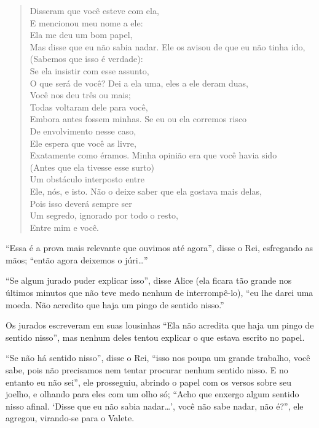 \begin{quote}
Disseram que você esteve com ela,\\
E mencionou meu nome a ele:\\
Ela me deu um bom papel,\\
Mas disse que eu não sabia nadar.
\medskip
Ele os avisou de que eu não tinha ido,\\
(Sabemos que isso é verdade):\\
Se ela insistir com esse assunto,\\
O que será de você?
\medskip
Dei a ela uma, eles a ele deram duas,\\
Você nos deu três ou mais;\\
Todas voltaram dele para você,\\
Embora antes fossem minhas.
\medskip
Se eu ou ela corremos risco\\
De envolvimento nesse caso,\\
Ele espera que você as livre,\\
Exatamente como éramos.
\medskip
Minha opinião era que você havia sido\\
(Antes que ela tivesse esse surto)\\
Um obstáculo interposto entre\\
Ele, nós, e isto.
\medskip
Não o deixe saber que ela gostava mais delas,\\
Pois isso deverá sempre ser\\
Um segredo, ignorado por todo o resto,\\
Entre mim e você.
\end{quote}

``Essa é a prova mais relevante que ouvimos até agora'', disse o Rei,
esfregando as mãos; ``então agora deixemos o júri\ldots{}''

``Se algum jurado puder explicar isso'', disse Alice (ela ficara tão
grande nos últimos minutos que não teve medo nenhum de interrompê-lo),
``eu lhe darei uma moeda. Não acredito que haja um pingo de sentido
nisso.''

Os jurados escreveram em suas lousinhas ``Ela não acredita que haja um
pingo de sentido nisso'', mas nenhum deles tentou explicar o que estava
escrito no papel.

``Se não há sentido nisso'', disse o Rei, ``isso nos poupa um grande
trabalho, você sabe, pois não precisamos nem tentar procurar nenhum
sentido nisso. E no entanto eu não sei'', ele prosseguiu, abrindo o
papel com os versos sobre seu joelho, e olhando para eles com um olho
só; ``Acho que enxergo algum sentido nisso afinal. `Disse que eu não
sabia nadar\ldots{}', você não sabe nadar, não é?'', ele agregou, virando-se
para o Valete.

